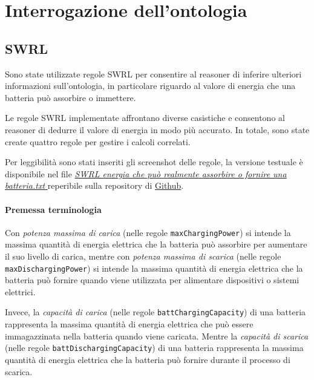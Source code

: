 \chapter{Interrogazione dell'ontologia}

\section{SWRL}
Sono state utilizzate regole SWRL per consentire al reasoner di inferire ulteriori informazioni sull'ontologia, in particolare riguardo al valore di energia che una batteria può assorbire o immettere.

Le regole SWRL implementate affrontano diverse casistiche e consentono al reasoner di dedurre il valore di energia in modo più accurato. In totale, sono state create quattro regole per gestire i calcoli correlati.


Per leggibilità sono stati inseriti gli screenshot delle regole, la versione testuale è disponibile nel file \href{https://github.com/19eddie/SemanticWeb-Assignment02-03/blob/main/SWRL%20energia%20che%20pu%C3%B2%20realmente%20assorbire%20o%20fornire%20una%20batteria.txt}{\textit{SWRL energia che può realmente assorbire o fornire una batteria.txt}
} reperibile sulla repository di \href{https://github.com/19eddie/SemanticWeb-Assignment02-03}{Github}. \\

\subsubsection{Premessa terminologia}
Con \textit{potenza massima di carica} (nelle regole \texttt{maxChargingPower}) si intende la massima quantità di energia elettrica che la batteria può assorbire per aumentare il suo livello di carica,
mentre con \textit{potenza massima di scarica} (nelle regole \texttt{maxDischargingPower}) si intende la massima quantità di energia elettrica che la batteria può fornire quando viene utilizzata per alimentare dispositivi o sistemi elettrici.

Invece, la \textit{capacità di carica} (nelle regole \texttt{battChargingCapacity}) di una batteria rappresenta la massima quantità di energia elettrica che può essere immagazzinata nella batteria quando viene caricata.
Mentre la \textit{capacità di scarica} (nelle regole \texttt{battDischargingCapacity}) di una batteria rappresenta la massima quantità di energia elettrica che la batteria può fornire durante il processo di scarica.


